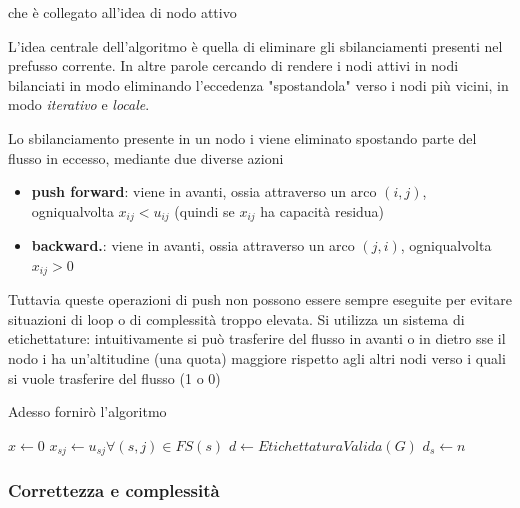 che è collegato all'idea di nodo attivo

L'idea centrale dell'algoritmo è quella di eliminare gli sbilanciamenti presenti nel prefusso corrente. In altre parole cercando di rendere i nodi attivi in nodi bilanciati in modo eliminando l'eccedenza "spostandola" verso i nodi più vicini, in modo \textit{iterativo} e \textit{locale}.

Lo sbilanciamento presente in un nodo i viene eliminato spostando parte del flusso in eccesso, mediante due diverse azioni
\begin{itemize}
  \item \textbf{push forward}: viene in avanti, ossia attraverso un arco $(i, j)$, ogniqualvolta $x_{ij} < u_{ij}$ (quindi se $x_{ij}$ ha capacità residua)
  \item \textbf{backward.}: viene in avanti, ossia attraverso un arco $(j, i)$, ogniqualvolta $x_{ij} > 0$
\end{itemize}

Tuttavia queste operazioni di push non possono essere sempre eseguite per evitare situazioni di loop o di complessità troppo elevata. Si utilizza un sistema di etichettature: intuitivamente si può trasferire del flusso in avanti o in dietro sse il nodo i ha un'altitudine (una quota) maggiore rispetto agli altri nodi verso i quali si vuole trasferire del flusso (1 o 0)

Adesso fornirò l'algoritmo 
\begin{algorithm}
  $x\gets 0$\;
  $x_{sj} \gets u_{sj} \forall(s, j) \in FS (s)$
  $d\gets EtichettaturaValida(G)$\;
  $d_s \gets n$
\end{algorithm}
\subsubsection{Correttezza e complessità}

